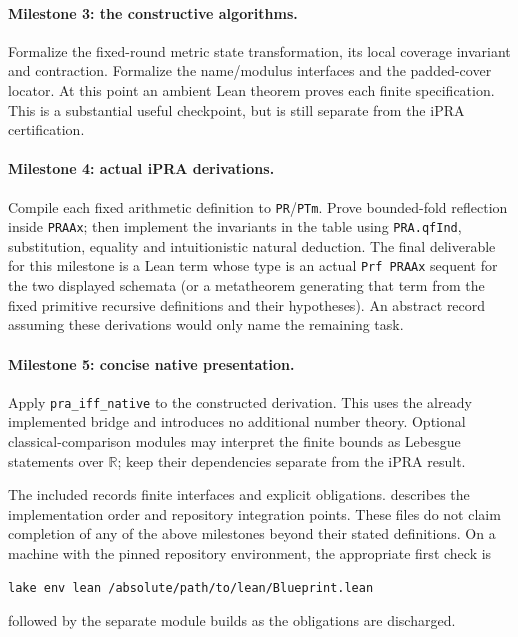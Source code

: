 \paragraph{Milestone 3: the constructive algorithms.}
Formalize the fixed-round metric state transformation, its local
coverage invariant and contraction.  Formalize the name/modulus
interfaces and the padded-cover locator.  At this point an ambient Lean
theorem proves each finite specification.  This is a substantial useful
checkpoint, but is still separate from the iPRA certification.

\paragraph{Milestone 4: actual iPRA derivations.}
Compile each fixed arithmetic definition to \texttt{PR}/\texttt{PTm}.
Prove bounded-fold reflection inside \texttt{PRAAx}; then implement
the invariants in the table using \texttt{PRA.qfInd}, substitution,
equality and intuitionistic natural deduction.  The final deliverable
for this milestone is a Lean term whose type is an actual
\texttt{Prf PRAAx} sequent for the two displayed schemata (or a
metatheorem generating that term from the fixed primitive recursive
definitions and their hypotheses).  An abstract record assuming these
derivations would only name the remaining task.

\paragraph{Milestone 5: concise native presentation.}
Apply \texttt{pra\_iff\_native} to the constructed derivation.  This uses
the already implemented bridge and introduces no additional number
theory.  Optional classical-comparison modules may interpret the finite
bounds as Lebesgue statements over $\mathbb R$; keep their dependencies
separate from the iPRA result.

The included  records finite interfaces and
explicit obligations.   describes the
implementation order and repository integration points.  These files
do not claim completion of any of the above milestones beyond their
stated definitions.  On a machine with the pinned repository environment,
the appropriate first check is
\begin{lstlisting}
lake env lean /absolute/path/to/lean/Blueprint.lean
\end{lstlisting}
followed by the separate module builds as the obligations are discharged.

